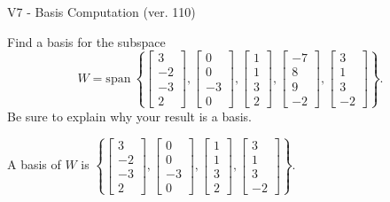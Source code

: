 \begin{exercise}
  \begin{exerciseTitle}V7 - Basis Computation (ver. 110)\end{exerciseTitle}
  \begin{exerciseStatement}
    Find a basis for the subspace 
\[W=\mathrm{span}\ \left\{\left[\begin{array}{r}
3 \\
-2 \\
-3 \\
2
\end{array}\right] , \left[\begin{array}{r}
0 \\
0 \\
-3 \\
0
\end{array}\right] , \left[\begin{array}{r}
1 \\
1 \\
3 \\
2
\end{array}\right] , \left[\begin{array}{r}
-7 \\
8 \\
9 \\
-2
\end{array}\right] , \left[\begin{array}{r}
3 \\
1 \\
3 \\
-2
\end{array}\right]\right\}.\]
 Be sure to explain why your result is a basis.


  \end{exerciseStatement}
  \begin{exerciseAnswer}
   A basis of \(W\) is  \(\left\{\left[\begin{array}{r}
3 \\
-2 \\
-3 \\
2
\end{array}\right] , \left[\begin{array}{r}
0 \\
0 \\
-3 \\
0
\end{array}\right] , \left[\begin{array}{r}
1 \\
1 \\
3 \\
2
\end{array}\right] , \left[\begin{array}{r}
3 \\
1 \\
3 \\
-2
\end{array}\right]\right\}\).
  


  \end{exerciseAnswer}
\end{exercise}